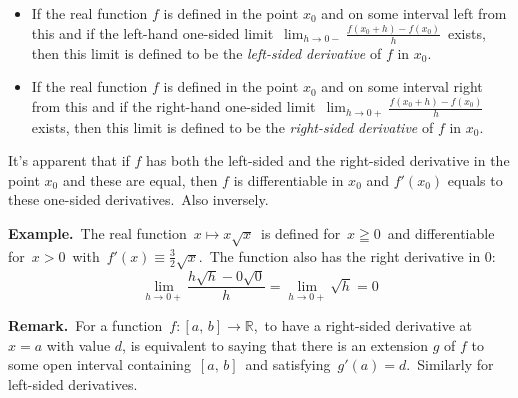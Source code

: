 \documentclass[12pt]{article}
\theoremstyle{definition}
\begin{document}
\begin{itemize}
\item If the real function $f$ is defined in the point $x_0$ and on some interval left from this and if the left-hand one-sided limit\, 
$\lim_{h\to 0-}\frac{f(x_0+h)-f(x_0)}{h}$\, exists, then this limit is defined to be the {\em left-sided derivative} of $f$ in $x_0$.
\item If the real function $f$ is defined in the point $x_0$ and on some interval right from this and if the right-hand one-sided limit\, 
$\lim_{h\to 0+} \frac{f(x_0+h)-f(x_0)}{h}$\, exists, then this limit is defined to be the {\em right-sided derivative} of $f$ in $x_0$.
\end{itemize}

It's apparent that if $f$ has both the left-sided and the right-sided derivative in the point $x_0$ and these are equal, then $f$ is differentiable in $x_0$ and $f'(x_0)$ equals to these one-sided derivatives.\, Also inversely.

\textbf{Example.}\, The real function\, $x \mapsto x\sqrt{x}$\, is defined for\, 
$x \geqq 0$\, and differentiable for\, $x > 0$\, with\, 
$f'(x) \equiv \frac{3}{2}\sqrt{x}$.\, The function also has the right derivative in $0$:
 $$\lim_{h \to 0+}\frac{h\sqrt{h}- 0\sqrt{0}}{h} = \lim_{h \to 0+}\sqrt{h} = 0$$

\textbf{Remark.}\, For a function\, $f\!: [a,\,b] \to \mathbb{R}$,\,
to have a right-sided derivative at\, $x = a$ with value $d$,
is equivalent to saying that there is an extension $g$
of $f$ to some open interval containing\, $[a,\,b]$\,
and satisfying\, $g'(a) = d$.\, Similarly for left-sided derivatives.
\end{document}
